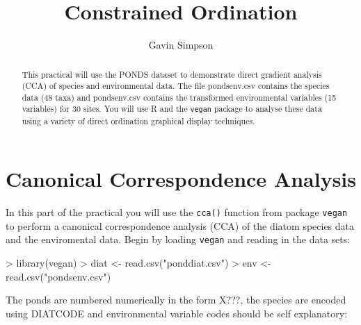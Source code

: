 \documentclass[a4paper,10pt]{article}
\title{Constrained Ordination}
\author{Gavin Simpson}
\newcommand{\cca}{\texttt{cca()}\xspace}
\newcommand{\R}{\textsf{R}\xspace}
\newcommand{\vegan}{\texttt{vegan}\xspace}
\begin{document}
\maketitle

\begin{abstract}
This practical will use the PONDS dataset to demonstrate direct gradient analysis (CCA) of species and environmental data. The file pondsenv.csv contains the species data (48 taxa) and pondsenv.csv contains the transformed environmental variables (15 variables) for 30 sites. You will use \R and the \vegan package to analyse these data using a variety of direct ordination graphical display techniques.
\end{abstract}


\section{Canonical Correspondence Analysis}
In this part of the practical you will use the \cca function from package \vegan to perform a canonical correspondence analysis (CCA) of the diatom species data and the enviromental data. Begin by loading \vegan and reading in the data sets:

\begin{Schunk}
\begin{Sinput}
> library(vegan)
> diat <- read.csv("ponddiat.csv")
> env <- read.csv("pondsenv.csv")
\end{Sinput}
\end{Schunk}

The ponds are numbered numerically in the form X???, the species are encoded using DIATCODE and environmental variable codes should be self explanatory:
\end{document}
